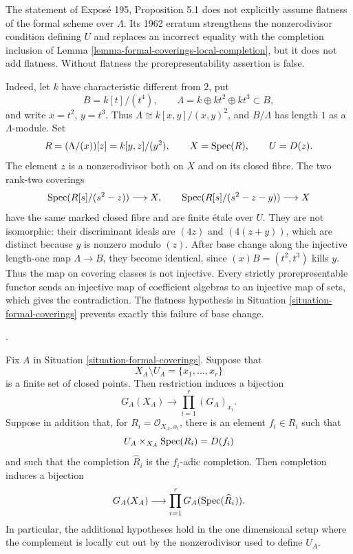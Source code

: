 \begin{remark}
\label{remark-formal-coverings-missing-flatness}
The statement of Expos\'e 195, Proposition 5.1 does not explicitly assume
flatness of the formal scheme over $\Lambda$. Its 1962 erratum strengthens the
nonzerodivisor condition defining $U$ and replaces an incorrect equality with
the completion inclusion of Lemma
\ref{lemma-formal-coverings-local-completion}, but it does not add flatness.
Without flatness the prorepresentability assertion is false.

Indeed, let $k$ have characteristic different from $2$, put
$$
B = k[t]/(t^4),
\qquad
\Lambda = k \oplus kt^2 \oplus kt^3 \subset B,
$$
and write $x=t^2$, $y=t^3$. Thus
$\Lambda \cong k[x,y]/(x,y)^2$, and $B/\Lambda$ has length $1$ as a
$\Lambda$-module. Set
$$
R = (\Lambda/(x))[z] = k[y,z]/(y^2),
\qquad X = \mathop{\mathrm{Spec}}(R),
\qquad U = D(z).
$$
The element $z$ is a nonzerodivisor both on $X$ and on its closed fibre. The
two rank-two coverings
$$
\mathop{\mathrm{Spec}}(R[s]/(s^2-z)) \longrightarrow X,
\qquad
\mathop{\mathrm{Spec}}(R[s]/(s^2-z-y)) \longrightarrow X
$$
have the same marked closed fibre and are finite \'etale over $U$. They are not
isomorphic: their discriminant ideals are $(4z)$ and $(4(z+y))$, which are
distinct because $y$ is nonzero modulo $(z)$. After base change along the
injective length-one map $\Lambda \to B$, they become identical, since
$(x)B=(t^2,t^3)$ kills $y$. Thus the map on covering classes is not injective.
Every strictly prorepresentable functor sends an injective map of coefficient
algebras to an injective map of sets, which gives the contradiction. The
flatness hypothesis in Situation \ref{situation-formal-coverings} prevents
exactly this failure of base change.
\end{remark}


\begin{lemma}
\label{lemma-formal-coverings-curve-local-product}
\begin{reference}
\cite[Expos\'e 195, C, Section 5, p. 389, together with the 1962 erratum,
p. 301]{FGA}.
\end{reference}
Fix $A$ in Situation \ref{situation-formal-coverings}. Suppose that
$$
X_A \setminus U_A = \{x_1, \ldots, x_r\}
$$
is a finite set of closed points. Then restriction induces a bijection
$$
G_A(X_A) \longrightarrow \prod_{i = 1}^r (G_A)_{x_i}.
$$
Suppose in addition that, for
$R_i = \mathcal{O}_{X_A, x_i}$, there is an element $f_i \in R_i$ such that
$$
U_A \times_{X_A} \mathop{\mathrm{Spec}}(R_i) = D(f_i)
$$
and such that the completion $\widehat R_i$ is the $f_i$-adic completion.
Then completion induces a bijection
$$
G_A(X_A) \longrightarrow
\prod_{i = 1}^r G_A(\mathop{\mathrm{Spec}}(\widehat R_i)).
$$
In particular, the additional hypotheses hold in the one dimensional setup
where the complement is locally cut out by the nonzerodivisor used to define
$U_A$.
\end{lemma}

